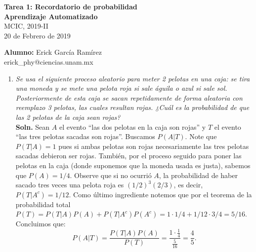 \documentclass[letterpaper,11pt]{article}
\author{Erick García Ramírez}
\begin{document}
\begin{flushleft}
    {\bf Tarea 1: Recordatorio de probabilidad}\\
    {\bf Aprendizaje Automatizado}\\
    {MCIC, 2019-II}\\
    20 de Febrero de 2019
\end{flushleft}
\vspace{-6\baselineskip}
\begin{flushright}
    {\bf Alumno:} Erick García Ramírez\\
     erick\_phy@ciencias.unam.mx\\
\end{flushright}
\vspace{2\baselineskip}
\begin{enumerate}
\item  \emph{Se usa el siguiente proceso aleatorio para meter 2 pelotas en una caja: se tira una moneda y
se mete una pelota roja si sale águila o azul si sale sol. Posteriormente de esta caja se sacan
repetidamente de forma aleatoria con reemplazo 3 pelotas, las cuales resultan rojas. ¿Cuál es
la probabilidad de que las 2 pelotas de la caja sean rojas?}\\
{\bf Soln.}  Sean $A$ el evento ``las dos pelotas en la caja son rojas'' y $T$ el evento ``las tres pelotas
sacadas son rojas''. Buscamos $P(A|T)$. Note que $P(T|A)=1$ pues si ambas pelotas son rojas necesariamente las
tres pelotas sacadas debieron ser rojas. También, por el proceso seguido para poner las pelotas en la caja
(donde suponemos que la moneda usada es justa), sabemos que $P(A)=1/4$. Observe que si no ocurrió $A$, la 
probabilidad de haber sacado tres veces una pelota roja es $(1/2)^3(2/3)$, es decir, $P(T|A^c)=1/12$.  
Como último ingrediente notemos que por el teorema de la probabilidad total
$P(T)=P(T|A)P(A)+P(T|A^c)P(A^c)=1\cdot 1/4+1/12\cdot 3/4=5/16$. Concluimos que:
\[P(A|T)=\frac{P(T|A)P(A)}{P(T)}=\frac{1\cdot\frac{1}{4}}{\frac{5}{16}}=\frac{4}{5}.\]


\end{enumerate}
\end{document}
